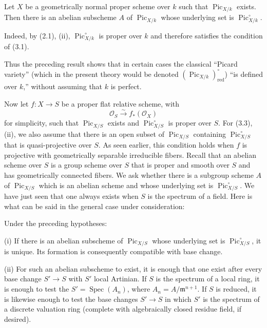  Let $X$ be a geometrically normal proper scheme over $k$ such that
$\operatorname{Pic}_{X/k}$ exists. Then there is an abelian subscheme $A$ of
$\operatorname{Pic}_{X/k}$ whose underlying set is
$\operatorname{Pic}_{X/k}^\circ$.

Indeed, by (2.1), (ii), $\operatorname{Pic}_{X/k}^\circ$ is proper over $k$ and
therefore satisfies the condition of (3.1).

Thus the preceding result shows that in certain cases the classical “Picard
variety” (which in the present theory would be denoted
$(\operatorname{Pic}_{X/k})_{\mathrm{red}}^\circ$) “is defined over $k$,”
without assuming that $k$ is perfect.

Now let $f:X\longrightarrow S$ be a proper flat relative scheme, with
\[
\mathcal O_S\xrightarrow{\sim}f_*(\mathcal O_X)
\]
for simplicity, such that $\operatorname{Pic}_{X/S}$ exists and
$\operatorname{Pic}_{X/S}^\circ$ is proper over $S$. For (3.3), (ii), we also
assume that there is an open subset of $\operatorname{Pic}_{X/S}$ containing
$\operatorname{Pic}_{X/S}^\circ$ that is quasi-projective over $S$. As seen
earlier, this condition holds when $f$ is projective with geometrically
separable irreducible fibers. Recall that an abelian scheme over $S$ is a group
scheme over $S$ that is proper and smooth over $S$ and has geometrically
connected fibers. We ask whether there is a subgroup scheme $A$ of
$\operatorname{Pic}_{X/S}$ which is an abelian scheme and whose underlying set
is $\operatorname{Pic}_{X/S}^\circ$. We have just seen that one always exists
when $S$ is the spectrum of a field. Here is what can be said in the general
case under consideration:

 Under the preceding hypotheses:

\noindent(i) If there is an abelian subscheme of
$\operatorname{Pic}_{X/S}$ whose underlying set is
$\operatorname{Pic}_{X/S}^\circ$, it is unique. Its formation is consequently
compatible with base change.

\noindent(ii) For such an abelian subscheme to exist, it is enough that one
exist after every base change $S'\longrightarrow S$ with $S'$ local Artinian.
If $S$ is the spectrum of a local ring, it is enough to test the
$S'=\operatorname{Spec}(A_n)$, where $A_n=A/\mathfrak m^{n+1}$. If $S$ is
reduced, it is likewise enough to test the base changes
$S'\longrightarrow S$ in which $S'$ is the spectrum of a discrete valuation
ring (complete with algebraically closed residue field, if desired).

